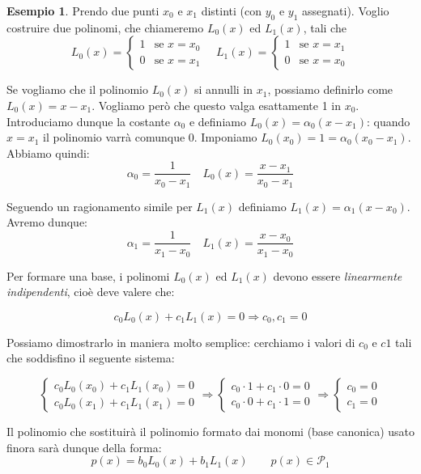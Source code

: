 \documentclass{article}
\theoremstyle{plain}
\theoremstyle{plain}
\theoremstyle{definition}
\theoremstyle{definition}
\newtheorem{esempio}{Esempio}
\begin{document}
\begin{esempio}
	Prendo due punti $x_{0}$ e $x_{1}$ distinti (con $y_{0}$ e $y_{1}$ assegnati).
	Voglio costruire due polinomi, che chiameremo $L_{0}(x)$ ed $L_{1}(x)$, tali che
	\[
	L_{0}(x)=
	\begin{cases}
		1 & \text{se $x=x_{0}$} \\
		0 & \text{se $x=x_{1}$}
	\end{cases}
	\quad
	L_{1}(x)=
	\begin{cases}
		1 & \text{se $x=x_{1}$} \\
		0 & \text{se $x=x_{0}$}
	\end{cases}
	\]
	
	Se vogliamo che il polinomio $L_{0}(x)$ si annulli in $x_{1}$, possiamo definirlo come $L_{0}(x)=x-x_{1}$. Vogliamo però che questo valga esattamente 1 in $x_{0}$. Introduciamo dunque la costante $\alpha_{0}$ e definiamo $L_{0}(x)=\alpha_{0}(x-x_{1})$: quando $x=x_{1}$ il polinomio varrà comunque $0$. Imponiamo $L_{0}(x_{0})=1=\alpha_{0}(x_{0}-x_{1})$.
	Abbiamo quindi:
	\[
	\alpha_{0}=\frac{1}{x_{0}-x_{1}}
	\quad
	L_{0}(x)=\frac{x-x_{1}}{x_{0}-x_{1}}
	\]
	
	Seguendo un ragionamento simile per $L_{1}(x)$ definiamo $L_{1}(x)=\alpha_{1}(x-x_{0})$. Avremo dunque:
	\[
	\alpha_{1}=\frac{1}{x_{1}-x_{0}}
	\quad
	L_{1}(x)=\frac{x-x_{0}}{x_{1}-x_{0}}
	\]
	
	Per formare una base, i polinomi $L_{0}(x)$ ed $L_{1}(x)$ devono essere \emph{linearmente indipendenti}, cioè deve valere che:
	
	\[
	c_{0}L_{0}(x)+c_{1}L_{1}(x)=0 \Rightarrow c_{0}, c_{1} = 0
	\]
	
	Possiamo dimostrarlo in maniera molto semplice: cerchiamo i valori di $c_{0}$ e $c{1}$ tali che soddisfino il seguente sistema:
	
	\[
	\begin{cases}
		c_{0}L_{0}(x_{0})+c_{1}L_{1}(x_{0})=0 \\
		c_{0}L_{0}(x_{1})+c_{1}L_{1}(x_{1})=0
	\end{cases}
	\Rightarrow
	\begin{cases}
		c_{0} \cdot 1 + c_{1} \cdot 0=0 \\
		c_{0} \cdot 0 + c_{1} \cdot 1=0
	\end{cases}
	\Rightarrow
	\begin{cases}
		c_{0}=0 \\
		c_{1}=0
	\end{cases}
	\]
	
	Il polinomio che sostituirà il polinomio formato dai monomi (base canonica) usato finora sarà dunque della forma:
	\[
	p(x) = b_{0}L_{0}(x) + b_{1}L_{1}(x) \qquad p(x) \in \mathcal{P}_{1}
	\]
	

\end{esempio}
\end{document}
